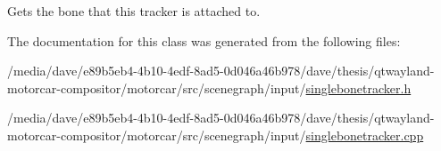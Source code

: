 Gets the bone that this tracker is attached to. 



The documentation for this class was generated from the following files\-:\begin{DoxyCompactItemize}
\item 
/media/dave/e89b5eb4-\/4b10-\/4edf-\/8ad5-\/0d046a46b978/dave/thesis/qtwayland-\/motorcar-\/compositor/motorcar/src/scenegraph/input/\hyperlink{singlebonetracker_8h}{singlebonetracker.\-h}\item 
/media/dave/e89b5eb4-\/4b10-\/4edf-\/8ad5-\/0d046a46b978/dave/thesis/qtwayland-\/motorcar-\/compositor/motorcar/src/scenegraph/input/\hyperlink{singlebonetracker_8cpp}{singlebonetracker.\-cpp}\end{DoxyCompactItemize}

